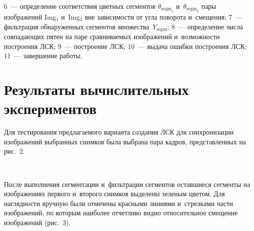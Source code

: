   \begin{figure} %
\vspace*{1pt}
 \begin{center}  
\mbox{%
 \epsfxsize=140.988mm
 }
\end{center} 
\vspace*{-9pt}
\end{figure}
  
  \begin{multicols}{2}
  
  \noindent
  {6}~--- определение соответствия цветных сегментов 
$\theta_{\mathrm{segm}_1}$ и~$\theta_{\mathrm{segm}_2}$ пары изоб\-ра\-же\-ний
Img$_1$ и~Img$_2$ вне зависимости от угла поворота и~смещения;
  {7}~--- фильт\-ра\-ция обнаруженных сегментов множества~$Y_{\mathrm{segm}}$;
  {8}~--- определение числа совпадающих пятен на паре сравниваемых 
изоб\-ра\-же\-ний и~возможности построения ЛСК;
  {9}~--- построение ЛСК;
  {10}~--- выдача ошибки построения ЛСК;
  {11}~--- завершение работы.
  
\vspace*{-6pt}

    \section{Результаты вычислительных экспериментов}
    
  Для тестирования предлагаемого варианта создания 
ЛСК для синхронизации изображений выбранных снимков была 
выбрана пара кадров, представленных на рис.~2. 
     
\begin{figure*} %
\vspace*{1pt}
 \begin{center}  
\mbox{%
 \epsfxsize=156.221mm
 }
\end{center} 
\vspace*{-9pt}
      \end{figure*}
      
  После выполнения сегментации и~фильтрации сегментов оставшиеся 
сегменты на изображениях первого и~второго снимков выделены зеленым 
цветом. Для наглядности вручную были отмечены красными линиями 
и~стрелками части изображений, по которым наиболее отчетливо видно 
относительное смещение изображений (рис.~3).
  

\end{multicols}
